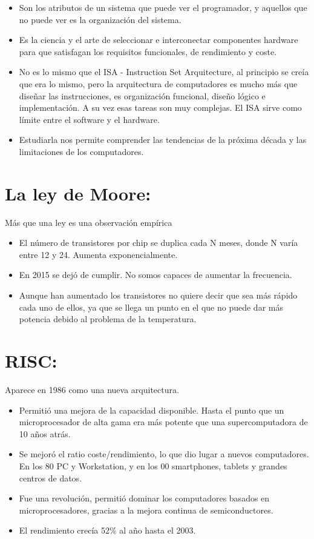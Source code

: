 \documentclass[12pt, twoside, openright]{report} %
\begin{document}
\begin{itemize}
	\item Son los atributos de un sistema que puede ver el programador, y
	      aquellos que no puede ver es la organización del sistema.
	\item Es la ciencia y el arte de seleccionar e interconectar componentes
	      hardware para que satisfagan los requisitos funcionales, de
	      rendimiento y coste.
	\item No es lo mismo que el ISA - Instruction Set Arquitecture, al
	      principio se creía que era lo mismo, pero la arquitectura de
	      computadores es mucho más que diseñar las instrucciones, es
	      organización funcional, diseño lógico e implementación. A su vez
	      esas tareas son muy complejas. El ISA sirve como límite entre el
	      software y el hardware.
	\item Estudiarla nos permite comprender las tendencias de la próxima
	      década y las limitaciones de los computadores.
\end{itemize}

\section{La ley de Moore:}

Más que una ley es una observación empírica

\begin{itemize}
	\item El número de transistores por chip se duplica cada N meses, donde N
	      varía entre 12 y 24. Aumenta exponencialmente.
	\item En 2015 se dejó de cumplir. No somos capaces de aumentar la
	      frecuencia.
	\item Aunque han aumentado los transistores no quiere decir que sea más
	      rápido cada uno de ellos, ya que se llega un punto en el que no
	      puede dar más potencia debido al problema de la temperatura.
\end{itemize}

\section{RISC:}

Aparece en 1986 como una nueva arquitectura.

\begin{itemize}
	\item Permitió una mejora de la capacidad disponible. Hasta el punto que
	      un microprocesador de alta gama era más potente que una
	      supercomputadora de 10 años atrás.
	\item Se mejoró el ratio coste/rendimiento, lo que dio lugar a nuevos
	      computadores. En los 80 PC y Workstation, y en los 00
	      smartphones, tablets y grandes centros de datos.
	\item Fue una revolución, permitió dominar los computadores basados en
	      microprocesadores, gracias a la mejora continua de semiconductores.
	\item El rendimiento crecía 52\% al año hasta el 2003.
\end{itemize}
\end{document}
